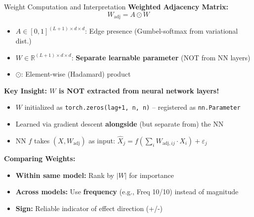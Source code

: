 \documentclass[aspectratio=169]{beamer}
\begin{document}
\begin{frame}{Weight Computation and Interpretation}
\textbf{Weighted Adjacency Matrix:}
\begin{equation*}
W_{\text{adj}} = A \odot W
\end{equation*}
\begin{itemize}
    \item $A \in [0,1]^{(L+1) \times d \times d}$: Edge presence (Gumbel-softmax from variational dist.)
    \item $W \in \mathbb{R}^{(L+1) \times d \times d}$: \textbf{Separate learnable parameter} (NOT from NN layers)
    \item $\odot$: Element-wise (Hadamard) product
\end{itemize}

\vspace{0.2cm}
\textbf{Key Insight: $W$ is NOT extracted from neural network layers!}
\begin{itemize}
    \item $W$ initialized as \texttt{torch.zeros(lag+1, n, n)} -- registered as \texttt{nn.Parameter}
    \item Learned via gradient descent \textbf{alongside} (but separate from) the NN
    \item NN $f$ takes $(X, W_{\text{adj}})$ as input: $\hat{X}_j = f\left(\sum_i W_{\text{adj},ij} \cdot X_i\right) + \varepsilon_j$
\end{itemize}

\vspace{0.2cm}
\textbf{Comparing Weights:}
\begin{itemize}
    \item \textbf{Within same model:} Rank by $|W|$ for importance
    \item \textbf{Across models:} Use \textbf{frequency} (e.g., Freq 10/10) instead of magnitude
    \item \textbf{Sign:} Reliable indicator of effect direction (+/-)
\end{itemize}
\end{frame}
\end{document}
